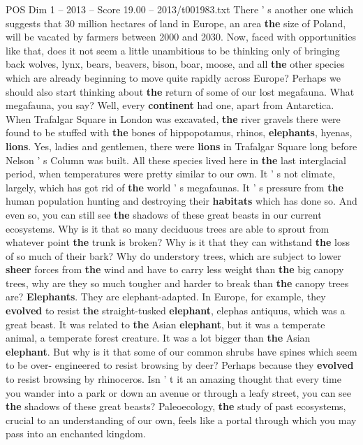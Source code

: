 \begin{textsample}{POS Dim 1 – 2013 – Score 19.00 – 2013/t001983.txt}
There ' s another one which suggests that 30 million hectares of land in Europe, an area \textbf{the} size of Poland, will be vacated by farmers between 2000 and 2030.
Now, faced with opportunities like that, does it not seem a little unambitious to be thinking only of bringing back wolves, lynx, bears, beavers, bison, boar, moose, and all \textbf{the} other species which are already beginning to move quite rapidly across Europe?
Perhaps we should also start thinking about \textbf{the} return of some of our lost megafauna.
What megafauna, you say?
Well, every \textbf{continent} had one, apart from Antarctica.
When Trafalgar Square in London was excavated, \textbf{the} river gravels there were found to be stuffed with \textbf{the} bones of hippopotamus, rhinos, \textbf{elephants}, hyenas, \textbf{lions}.
Yes, ladies and gentlemen, there were \textbf{lions} in Trafalgar Square long before Nelson ' s Column was built.
All these species lived here in \textbf{the} last interglacial period, when temperatures were pretty similar to our own.
It ' s not climate, largely, which has got rid of \textbf{the} world ' s megafaunas.
It ' s pressure from \textbf{the} human population hunting and destroying their \textbf{habitats} which has done so.
And even so, you can still see \textbf{the} shadows of these great beasts in our current ecosystems.
Why is it that so many deciduous trees are able to sprout from whatever point \textbf{the} trunk is broken?
Why is it that they can withstand \textbf{the} loss of so much of their bark?
Why do understory trees, which are subject to lower \textbf{sheer} forces from \textbf{the} wind and have to carry less weight than \textbf{the} big canopy trees, why are they so much tougher and harder to break than \textbf{the} canopy trees are? \textbf{Elephants}.
They are elephant-adapted.
In Europe, for example, they \textbf{evolved} to resist \textbf{the} straight-tusked \textbf{elephant}, elephas antiquus, which was a great beast.
It was related to \textbf{the} Asian \textbf{elephant}, but it was a temperate animal, a temperate forest creature.
It was a lot bigger than \textbf{the} Asian \textbf{elephant}.
But why is it that some of our common shrubs have spines which seem to be over- engineered to resist browsing by deer?
Perhaps because they \textbf{evolved} to resist browsing by rhinoceros.
Isn ' t it an amazing thought that every time you wander into a park or down an avenue or through a leafy street, you can see \textbf{the} shadows of these great beasts?
Paleoecology, \textbf{the} study of past ecosystems, crucial to an understanding of our own, feels like a portal through which you may pass into an enchanted kingdom.

\end{textsample}
